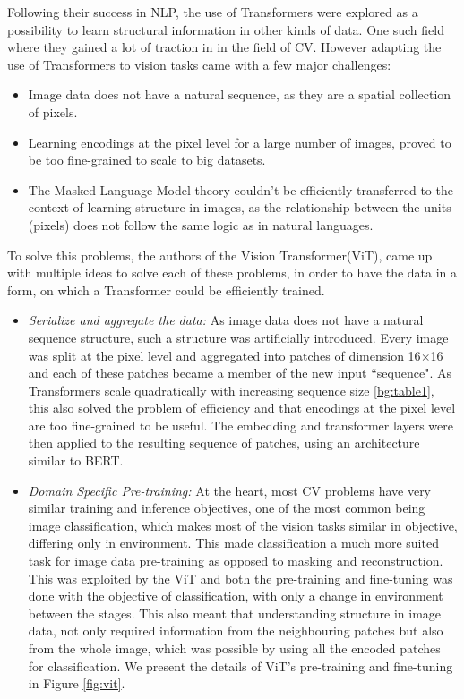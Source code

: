 Following their success in NLP, the use of Transformers were explored as a possibility to learn structural information in other kinds of data. One such field where they gained a lot of traction in in the field of CV.
However adapting the use of Transformers to vision tasks came with a few major challenges: 
\begin{itemize}
\item Image data does not have a natural sequence, as they are a spatial collection of pixels.
\item Learning encodings at the pixel level for a large number of images, proved to be too fine-grained to scale to big datasets.
\item The Masked Language Model theory couldn't be efficiently transferred to the context of learning structure in images, as the relationship between the units (pixels) does not follow the same logic as in natural languages.
\end{itemize}

To solve this problems, the authors of the Vision Transformer(ViT)\cite{dosovitskiyImageWorth16x162021}, came up with multiple ideas to solve each of these problems, in order to have the data in a form, on which a Transformer could be efficiently trained.
\begin{itemize}
\item \emph{Serialize and aggregate the data: } As image data does not have a natural sequence structure, such a structure was artificially introduced. Every image was split at the pixel level and aggregated into patches of dimension 16$\times$16 and each of these patches became a member of the new input ``sequence". As Transformers scale quadratically with increasing sequence size \ref{bg:table1}, this also solved the problem of efficiency and that encodings at the pixel level are too fine-grained to be useful. The embedding and transformer layers were then applied to the resulting sequence of patches, using an architecture similar to BERT.
\item \emph{Domain Specific Pre-training: } At the heart, most CV problems have very similar training and inference objectives, one of the most common being image classification, which makes most of the vision tasks similar in objective, differing only in environment. This made classification a much more suited task for image data pre-training as opposed to masking and reconstruction. This was exploited by the ViT and both the pre-training and fine-tuning was done with the objective of classification, with only a change in environment between the stages. This also meant that understanding structure in image data, not only required information from the neighbouring patches but also from the whole image, which was possible by using all the encoded patches for classification. We present the details of ViT's pre-training and fine-tuning in Figure \ref{fig:vit}.
\end{itemize}

